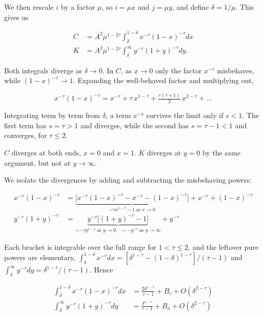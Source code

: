 \documentclass[aps, pre, reprint]{revtex4-2}
\begin{document}
We then rescale $i$ by a factor $\mu$, so $i \!=\! \mu x$ and $j \!=\! \mu y$, and define $\delta=1/\mu$. This gives us

\begin{align}
    C &= A^2\mu^{1-2\tau}\!\!\int_\delta^{1-\delta}\!\! x^{-\tau}(1-x)^{-\tau}dx \\
    K &= A^2\mu^{1-2\tau}\!\!\int_\delta^{\infty}\!\! y^{-\tau}(1+y)^{-\tau}dy .
\end{align}

Both integrals diverge as $\delta\to0$. In $C$, as $x\to0$ only the factor $x^{-\tau}$ misbehaves, while $(1-x)^{-\tau}\to1$. Expanding the well-behaved factor and multiplying out,

\begin{equation}
    x^{-\tau}(1-x)^{-\tau} = x^{-\tau} + \tau\,x^{1-\tau} + \tfrac{\tau(\tau+1)}{2}\,x^{2-\tau} + \dots
\end{equation}

Integrating term by term from $\delta$, a term $x^{-s}$ survives the limit only if $s<1$. The first term has $s=\tau>1$ and diverges, while the second has $s=\tau-1<1$ and converges, for $\tau\leq 2$.

$C$ diverges at both ends, $x=0$ and $x=1$. $K$ diverges at $y=0$ by the same argument, but not at $y\to\infty$. 

We isolate the divergences by adding and subtracting the misbehaving powers:

\begin{align}
    x^{-\tau}(1\!-\!x)^{-\tau} &= \underbrace{\Big[x^{-\tau}(1\!-\!x)^{-\tau}-x^{-\tau}-(1\!-\!x)^{-\tau}\Big]}_{\sim\tau x^{1-\tau}-1\ \text{as } x\to0} + x^{-\tau} + (1\!-\!x)^{-\tau} \\
    y^{-\tau}(1\!+\!y)^{-\tau} &= \underbrace{y^{-\tau}\Big[(1\!+\!y)^{-\tau}-1\Big]}_{\sim-\tau y^{1-\tau}\ \text{as } y\to0,\ \ \sim -y^{-\tau}\ \text{as } y\to\infty} + y^{-\tau}
\end{align}


Each bracket is integrable over the full range for $1<\tau\leq2$, and the leftover pure powers are elementary, $\int_\delta^{1-\delta}x^{-\tau}dx=[\delta^{1-\tau}-(1-\delta)^{1-\tau}]/(\tau-1)$ and $\int_\delta^\infty y^{-\tau}dy=\delta^{1-\tau}/(\tau-1)$. Hence

\begin{align}
    \int_\delta^{1-\delta}\!\!\! x^{-\tau}(1-x)^{-\tau}dx &= \frac{2\delta^{1-\tau}}{\tau-1}+B_c+O(\delta^{2-\tau}) \\
    \int_\delta^{\infty}\!\!\! y^{-\tau}(1+y)^{-\tau}dy &= \frac{\delta^{1-\tau}}{\tau-1}+B_a+O(\delta^{2-\tau}) 
\end{align}
\end{document}
